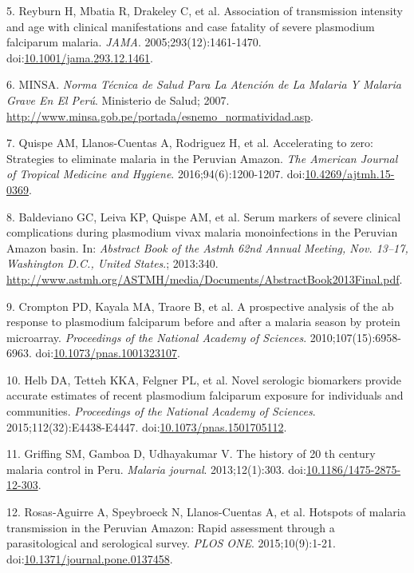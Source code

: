 \documentclass[a4paper]{article}
\begin{document}
\hypertarget{ref-reyburn2015}{}
5. Reyburn H, Mbatia R, Drakeley C, et al. Association of transmission
intensity and age with clinical manifestations and case fatality of
severe plasmodium falciparum malaria. \emph{JAMA}.
2005;293(12):1461-1470.
doi:\href{https://doi.org/10.1001/jama.293.12.1461}{10.1001/jama.293.12.1461}.

\hypertarget{ref-norma2001}{}
6. MINSA. \emph{Norma Técnica de Salud Para La Atención de La Malaria Y
Malaria Grave En El Perú}. Ministerio de Salud; 2007.
\url{http://www.minsa.gob.pe/portada/esnemo_normatividad.asp}.

\hypertarget{ref-accelerate2016}{}
7. Quispe AM, Llanos-Cuentas A, Rodriguez H, et al. Accelerating to
zero: Strategies to eliminate malaria in the Peruvian Amazon. \emph{The
American Journal of Tropical Medicine and Hygiene}.
2016;94(6):1200-1207.
doi:\href{https://doi.org/10.4269/ajtmh.15-0369}{10.4269/ajtmh.15-0369}.

\hypertarget{ref-baldevi2013}{}
8. Baldeviano GC, Leiva KP, Quispe AM, et al. Serum markers of severe
clinical complications during plasmodium vivax malaria monoinfections in
the Peruvian Amazon basin. In: \emph{Abstract Book of the Astmh 62nd
Annual Meeting, Nov. 13--17, Washington D.C., United States}.; 2013:340.
\url{http://www.astmh.org/ASTMH/media/Documents/AbstractBook2013Final.pdf}.

\hypertarget{ref-crompton2010}{}
9. Crompton PD, Kayala MA, Traore B, et al. A prospective analysis of
the ab response to plasmodium falciparum before and after a malaria
season by protein microarray. \emph{Proceedings of the National Academy
of Sciences}. 2010;107(15):6958-6963.
doi:\href{https://doi.org/10.1073/pnas.1001323107}{10.1073/pnas.1001323107}.

\hypertarget{ref-Helb2015exposure}{}
10. Helb DA, Tetteh KKA, Felgner PL, et al. Novel serologic biomarkers
provide accurate estimates of recent plasmodium falciparum exposure for
individuals and communities. \emph{Proceedings of the National Academy
of Sciences}. 2015;112(32):E4438-E4447.
doi:\href{https://doi.org/10.1073/pnas.1501705112}{10.1073/pnas.1501705112}.

\hypertarget{ref-griffing2013history}{}
11. Griffing SM, Gamboa D, Udhayakumar V. The history of 20 th century
malaria control in Peru. \emph{Malaria journal}. 2013;12(1):303.
doi:\href{https://doi.org/10.1186/1475-2875-12-303}{10.1186/1475-2875-12-303}.

\hypertarget{ref-hotspots2015}{}
12. Rosas-Aguirre A, Speybroeck N, Llanos-Cuentas A, et al. Hotspots of
malaria transmission in the Peruvian Amazon: Rapid assessment through a
parasitological and serological survey. \emph{PLOS ONE}.
2015;10(9):1-21.
doi:\href{https://doi.org/10.1371/journal.pone.0137458}{10.1371/journal.pone.0137458}.
\end{document}
